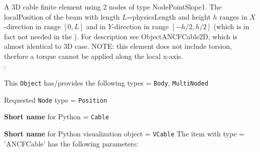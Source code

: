
\label{sec:item:ObjectANCFCable}
A 3D cable finite element using 2 nodes of type NodePointSlope1. The localPosition of the beam with length $L$=physicsLength and height $h$ ranges in $X$-direction in range $[0, L]$ and in $Y$-direction in range $[-h/2,h/2]$ (which is in fact not needed in the ). For description see ObjectANCFCable2D, which is almost identical to 3D case. NOTE: this element does not include torsion, therfore a torque cannot be applied along the local x-axis.
\vspace{12pt}\\

\noindent {}:
\bi
  \item This \texttt{Object} has/provides the following types = \texttt{Body}, \texttt{MultiNoded}
  \item Requested \texttt{Node} type = \texttt{Position}
  \item {\bf Short name} for Python = \texttt{Cable}
  \item {\bf Short name} for Python visualization object = \texttt{VCable}
\ei\vspace{12pt} \noindent 
The item  with type = 'ANCFCable' has the following parameters:
\vspace{-0.5cm}\\
\vspace{-0.5cm}\\
